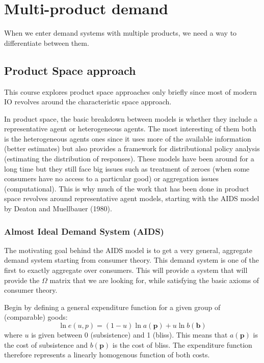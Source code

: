 \documentclass[12pt]{report}
\begin{document}
\section{Multi-product demand}

When we enter demand systems with multiple products, we need a way to differentiate between them.

\subsection{Product Space approach}

This course explores product space approaches only briefly since most of modern IO revolves around the characteristic space approach.

In product space, the basic breakdown between models is whether they include a representative agent or heterogeneous agents. The most interesting of them both is the heterogeneous agents ones since it uses more of the available information (better estimates) but also provides a framework for distributional policy analysis (estimating the distribution of responses). These models have been around for a long time but they still face big issues such as treatment of zeroes (when some consumers have no access to a particular good) or aggregation issues (computational). This is why much of the work that has been done in product space revolves around representative agent models, starting with the AIDS model by Deaton and Muellbauer (1980).

\subsubsection{Almost Ideal Demand System (AIDS)}

The motivating goal behind the AIDS model is to get a very general, aggregate demand system starting from consumer theory. This demand system is one of the first to exactly aggregate over consumers. This will provide a system that will provide the $\Omega$ matrix that we are looking for, while satisfying the basic axioms of consumer theory. 

Begin by defining a general expenditure function for a given group of (comparable) goods: $$ \ln e(u, p) = (1 - u)\ln a(\mathbf{p}) + u \ln b(\mathbf{b}) $$ where $u$ is given between 0 (subsistence) and 1 (bliss). This means that $a(\mathbf{p})$ is the cost of subsistence and $b(\mathbf{p})$ is the cost of bliss. The expenditure function therefore represents a linearly homogenous function of both costs.
\end{document}

